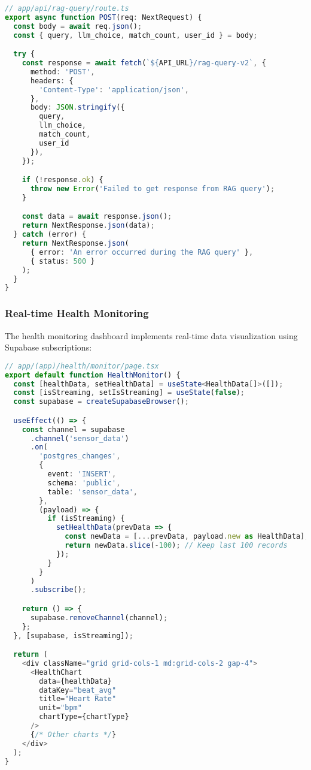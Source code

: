 \begin{lstlisting}[language=typescript,
                   basicstyle=\ttfamily\small,
                   keywordstyle=\color{blue},
                   stringstyle=\color{red},
                   commentstyle=\color{green!60!black}]
// app/api/rag-query/route.ts
export async function POST(req: NextRequest) {
  const body = await req.json();
  const { query, llm_choice, match_count, user_id } = body;

  try {
    const response = await fetch(`${API_URL}/rag-query-v2`, {
      method: 'POST',
      headers: {
        'Content-Type': 'application/json',
      },
      body: JSON.stringify({ 
        query, 
        llm_choice, 
        match_count, 
        user_id
      }),
    });

    if (!response.ok) {
      throw new Error('Failed to get response from RAG query');
    }

    const data = await response.json();
    return NextResponse.json(data);
  } catch (error) {
    return NextResponse.json(
      { error: 'An error occurred during the RAG query' }, 
      { status: 500 }
    );
  }
}
\end{lstlisting}

\subsubsection{Real-time Health Monitoring}
The health monitoring dashboard implements real-time data visualization using Supabase subscriptions:

\begin{lstlisting}[language=typescript,
                   basicstyle=\ttfamily\small,
                   keywordstyle=\color{blue},
                   stringstyle=\color{red},
                   commentstyle=\color{green!60!black}]
// app/(app)/health/monitor/page.tsx
export default function HealthMonitor() {
  const [healthData, setHealthData] = useState<HealthData[]>([]);
  const [isStreaming, setIsStreaming] = useState(false);
  const supabase = createSupabaseBrowser();

  useEffect(() => {
    const channel = supabase
      .channel('sensor_data')
      .on(
        'postgres_changes',
        {
          event: 'INSERT',
          schema: 'public',
          table: 'sensor_data',
        },
        (payload) => {
          if (isStreaming) {
            setHealthData(prevData => {
              const newData = [...prevData, payload.new as HealthData];
              return newData.slice(-100); // Keep last 100 records
            });
          }
        }
      )
      .subscribe();

    return () => {
      supabase.removeChannel(channel);
    };
  }, [supabase, isStreaming]);

  return (
    <div className="grid grid-cols-1 md:grid-cols-2 gap-4">
      <HealthChart 
        data={healthData} 
        dataKey="beat_avg" 
        title="Heart Rate" 
        unit="bpm" 
        chartType={chartType} 
      />
      {/* Other charts */}
    </div>
  );
}
\end{lstlisting}

